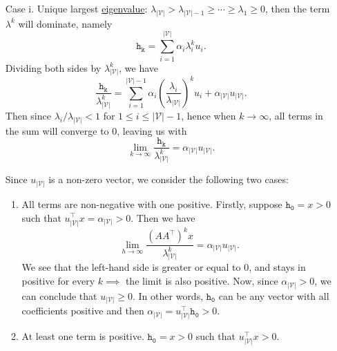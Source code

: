 \begin{enumerate}
	\item[Case i.] Unique largest \hyperref[def:eigenvalue]{eigenvalue}:
		\(\lambda_{\left\vert \mathcal{V} \right\vert } > \lambda_{\left\vert \mathcal{V} \right\vert -1} \geq \cdots \geq \lambda_{1}\geq 0\),
		then the term \(\lambda^k\)	will dominate, namely
		\[
			\mathtt{h_k} = \sum\limits_{i=1}^{\left\vert \mathcal{V} \right\vert } \alpha_{i}\lambda_{i}^k u_{i}.
		\]
		Dividing both sides by \(\lambda_{\left\vert \mathcal{V} \right\vert }^k\), we have
		\[
			\frac{\mathtt{h_{k}}}{\lambda_{\left\vert \mathcal{V} \right\vert }^k}
			= \sum\limits_{i=1}^{\left\vert \mathcal{V} \right\vert  - 1}\alpha_{i}
			\left(\frac{\lambda_{i}}{\lambda_{\left\vert \mathcal{V} \right\vert }}\right)^k u_{i}
			+ \alpha_{\left\vert \mathcal{V} \right\vert }u_{\left\vert \mathcal{V} \right\vert }.
		\]
		Then since \(\lambda_{i}/\lambda_{\left\vert \mathcal{V} \right\vert }< 1\) for \(1\leq i\leq \left\vert \mathcal{V} \right\vert -1\), hence when \(k\to \infty\), all terms in the sum will converge to \(0\), leaving us with
		\[
			\lim_{k \to \infty} \frac{\mathtt{h_k}}{\lambda_{\left\vert \mathcal{V} \right\vert }^k}= \alpha_{\left\vert \mathcal{V} \right\vert } u_{\left\vert \mathcal{V} \right\vert }.
		\]

		Since \(u_{\left\vert \mathcal{V} \right\vert }\) is a non-zero vector, we consider the following two cases:
		\begin{enumerate}
			\item All terms are non-negative with one positive. Firstly, suppose \(\mathtt{h_0}= x>0\) such that \(u_{\left\vert \mathcal{V} \right\vert }^{\top}x = \alpha_{\left\vert \mathcal{V} \right\vert } >0\).
			      Then we have
			      \[
				      \lim\limits_{h \to \infty} \frac{\left(A A^{\top}\right)^k x}{\lambda_{\left\vert \mathcal{V} \right\vert }^k} = \alpha_{\left\vert \mathcal{V} \right\vert }u_{\left\vert \mathcal{V} \right\vert }.
			      \]
			      We see that the left-hand side is greater or equal to \(0\), and stays in positive for every \(k\implies \) the limit is also positive. Now, since \(\alpha_{\left\vert \mathcal{V} \right\vert }>0\), we can conclude that \(u_{\left\vert \mathcal{V} \right\vert }\geq 0\). In other words, \(\mathtt{h_0}\) can be any vector with all coefficients positive and then \(\alpha_{\left\vert \mathcal{V} \right\vert } = u^{\top}_{\left\vert \mathcal{V} \right\vert }\mathtt{h_0}>0\).
			\item At least one term is positive. \(\mathtt{h_0} = x > 0\) such that \(u_{\left\vert \mathcal{V} \right\vert }^{\top}x>0\).
		\end{enumerate}


\end{enumerate}
